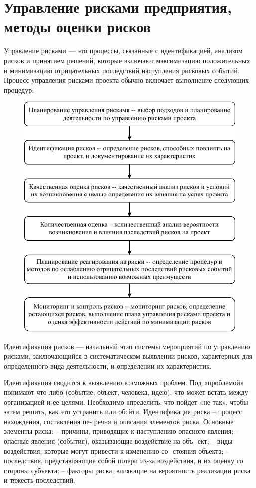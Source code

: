 \section{Управление рисками предприятия, методы оценки рисков}

Управление рисками --- это процессы, связанные с идентификацией, анализом рисков и принятием решений, которые включают максимизацию положительных и минимизацию отрицательных последствий наступления рисковых событий. Процесс управления рисками проекта обычно включает выполнение следующих процедур:
\begin{figure}
	\centering
	\includegraphics[width=0.7\linewidth]{Diagram-Page-2}
	\caption{}
	\label{fig:diagram-page-2}
\end{figure}

Идентификация рисков --- начальный этап системы мероприятий по управлению рисками, заключающийся в систематическом выявлении рисков, характерных для определенного вида деятельности, и определении их характеристик.

Идентификация сводится к выявлению возможных проблем. 
Под «проблемой» понимают что-либо (событие, объект, человека, идею), что может встать между организацией и ее целями.
Необходимо определить, что пойдет «не так», чтобы затем решить, как это устранить
или обойти.
Идентификация риска – процесс нахождения, составления пе-
речня и описания элементов риска.
Основные элементы риска:
– причины, приводящие к наступлению опасного явления;
– опасные явления (события), оказывающие воздействие на объ-
ект;
– виды воздействия, которые могут привести к изменению со-
стояния объекта;
– последствия, представляющие собой потери из-за воздействия,
и их оценку со стороны субъекта;
– факторы риска, влияющие на вероятность реализации риска
и тяжесть последствий.

